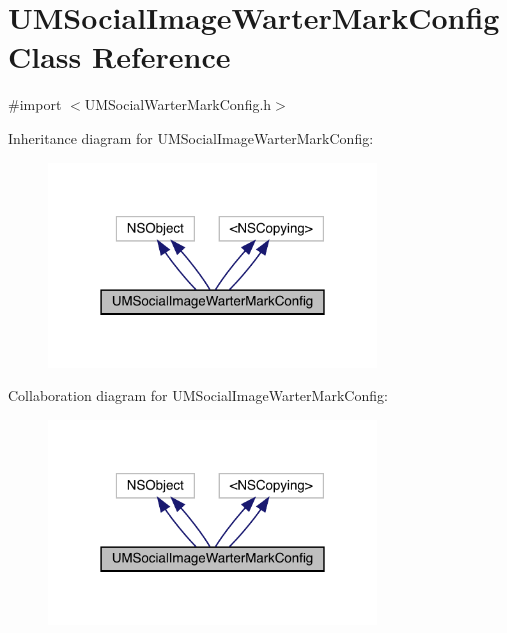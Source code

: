 \hypertarget{interface_u_m_social_image_warter_mark_config}{}\section{U\+M\+Social\+Image\+Warter\+Mark\+Config Class Reference}
\label{interface_u_m_social_image_warter_mark_config}


{\ttfamily \#import $<$U\+M\+Social\+Warter\+Mark\+Config.\+h$>$}



Inheritance diagram for U\+M\+Social\+Image\+Warter\+Mark\+Config\+:\nopagebreak
\begin{figure}[H]
\begin{center}
\leavevmode
\includegraphics[width=247pt]{interface_u_m_social_image_warter_mark_config__inherit__graph}
\end{center}
\end{figure}


Collaboration diagram for U\+M\+Social\+Image\+Warter\+Mark\+Config\+:\nopagebreak
\begin{figure}[H]
\begin{center}
\leavevmode
\includegraphics[width=247pt]{interface_u_m_social_image_warter_mark_config__coll__graph}
\end{center}
\end{figure}
